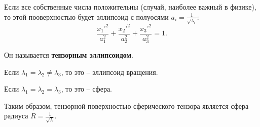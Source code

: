 	Если все собственные числа положительны (случай, наиболее важный в физике), то этой пооверхностью будет эллипсоид с полуосями \( a_i = \frac{1}{\sqrt{\lambda_i}} \):
	\[ \frac{x_1{’}^2}{a_1^2} + \frac{x_2{’}^2}{a_2^2} + \frac{x_3{’}^2}{a_3^2} = 1. \]
	
	Он называется \textbf{тензорным эллипсоидом}.
	
	Если \( \lambda_1 = \lambda_2 \ne \lambda_3 \), то это -- эллипсоид вращения.
	
	Если \( \lambda_1 = \lambda_2 = \lambda_3 \), то это -- сфера.
	
	Таким образом, тензорной поверхностью сферического тензора является сфера радиуса \( R = \frac{1}{\sqrt{\lambda}} \).
